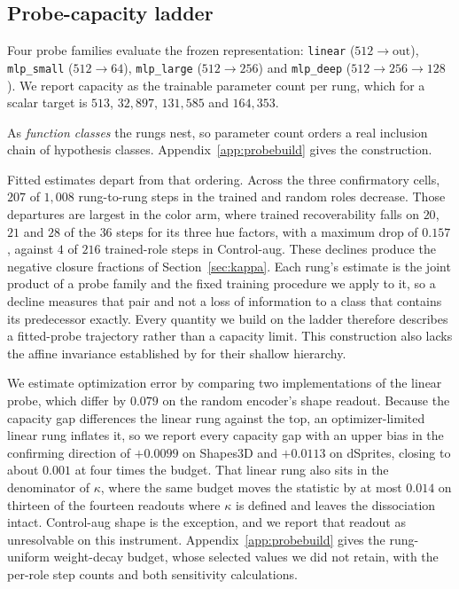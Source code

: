 \documentclass[10pt]{article}
\begin{document}
\subsection{Probe-capacity ladder}
\label{sec:ladder}
Four probe families evaluate the frozen representation: \texttt{linear} ($512 \rightarrow
\text{out}$),
\texttt{mlp\_small} ($512 \rightarrow 64$), \texttt{mlp\_large} ($512 \rightarrow 256$) and
\texttt{mlp\_deep} ($512 \rightarrow 256 \rightarrow 128$). We report capacity as the trainable
parameter count per rung, which for a scalar target is $513$, $32{,}897$, $131{,}585$ and
$164{,}353$.

As \emph{function classes} the rungs nest, so parameter count orders a real inclusion chain of
hypothesis classes. Appendix~\ref{app:probebuild} gives the construction.

Fitted estimates depart from that ordering. Across the three confirmatory cells, $207$ of
$1{,}008$ rung-to-rung steps in the trained and random roles decrease. Those departures are largest in
the color arm, where trained recoverability falls on $20$, $21$ and $28$ of the $36$ steps for its
three hue factors, with a maximum drop of $0.157$, against $4$ of $216$ trained-role steps in
Control-aug. These declines produce the negative closure fractions of Section~\ref{sec:kappa}. Each
rung's estimate is the joint product of a probe family and the fixed training procedure we apply to
it, so a decline measures that pair and not a loss of information to a class that contains its
predecessor exactly. Every quantity we build on the ladder therefore describes a fitted-probe
trajectory rather than a capacity limit. This construction also lacks the affine invariance
established by \citet{lee2026shallow} for their shallow hierarchy.

We estimate optimization error by comparing two implementations of the linear probe, which differ
by $0.079$ on the random encoder's shape readout. Because the capacity gap differences the linear
rung against the top, an optimizer-limited linear rung inflates it, so we report every capacity gap
with an upper bias in the confirming direction of $+0.0099$ on Shapes3D and $+0.0113$ on dSprites,
closing to about $0.001$ at four times the budget. That linear rung also sits in the denominator of
$\kappa$, where the same budget moves the statistic by at most $0.014$ on thirteen of the fourteen
readouts where $\kappa$ is defined and leaves the dissociation intact. Control-aug shape is the
exception, and we report that readout as unresolvable on this instrument.
Appendix~\ref{app:probebuild} gives the rung-uniform weight-decay budget, whose selected values we
did not retain, with the per-role step counts and both sensitivity calculations.
\end{document}
